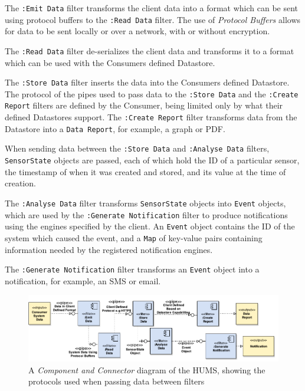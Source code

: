 \documentclass[10pt,a4paper]{article}
\begin{document}
The \texttt{:Emit Data} filter transforms the client data into a format which can be sent using protocol buffers to the \texttt{:Read Data} filter. The use of \emph{Protocol Buffers} allows for data to be sent locally or over a network, with or without encryption. 

The \texttt{:Read Data} filter de-serializes the client data and transforms it to a format which can be used with the Consumers defined Datastore. 

The \texttt{:Store Data} filter inserts the data into the Consumers defined Datastore.
The protocol of the pipes used to pass data to the \texttt{:Store Data} and the \texttt{:Create Report} filters are defined by the Consumer, being limited only by what their defined Datastores support.
The \texttt{:Create Report} filter transforms data from the Datastore into a \texttt{Data Report}, for example, a graph or PDF.

When sending data between the \texttt{:Store Data} and \texttt{:Analyse Data} filters, \texttt{SensorState} objects are passed, each of which hold the ID of a particular sensor, the timestamp of when it was created and stored, and its value at the time of creation. 

The \texttt{:Analyse Data} filter transforms \texttt{SensorState} objects into \texttt{Event} objects, which are used by the \texttt{:Generate Notification} filter to produce notifications using the engines specified by the client.
An \texttt{Event} object contains the ID of the system which caused the event, and a \texttt{Map} of key-value pairs containing information needed by the registered notification engines.

The \texttt{:Generate Notification} filter transforms an \texttt{Event} object into a notification, for example, an SMS or email. 

\begin{figure}[ht]
  \includegraphics[width=\textwidth]{images/pipesAndFilters.pdf}
  \caption{A \emph{Component and Connector} diagram of the HUMS, showing the protocols used when passing data between filters}
  \label{fig:pipesAndFilter}
\end{figure}
\end{document}
